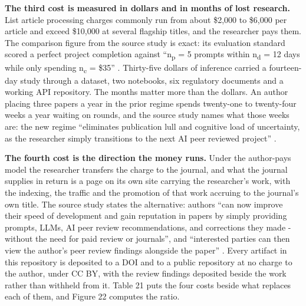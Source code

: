 \textbf{The third cost is measured in dollars and in months of lost research.}
List article processing charges commonly run from about \$2,000 to \$6,000 per
article and exceed \$10,000 at several flagship titles, and the researcher pays
them. The comparison figure from the source study is exact: its evaluation
standard scored a perfect project completion against ``n\textsubscript{p} = 5
prompts within n\textsubscript{d} = 12 days while only spending
n\textsubscript{c} = \$35'' \cite{aiprgliomatc}. Thirty-five dollars of
inference carried a fourteen-day study through a dataset, two notebooks, six
regulatory documents and a working API repository. The months matter more than
the dollars. An author placing three papers a year in the prior regime spends
twenty-one to twenty-four weeks a year waiting on rounds, and the source study
names what those weeks are: the new regime
``eliminates publication lull and cognitive load of uncertainty, as the
researcher simply transitions to the next AI peer reviewed project''
\cite{aiprgliomatc}.

\textbf{The fourth cost is the direction the money runs.} Under the author-pays
model the researcher transfers the charge to the journal, and what the journal
supplies in return is a page on its own site carrying the researcher's work,
with the indexing, the traffic and the promotion of that work accruing to the
journal's own title. The source study states the alternative: authors ``can now improve their speed of development and gain
reputation in papers by simply providing prompts, LLMs, AI peer review
recommendations, and corrections they made - without the need for paid review or
journals'', and ``interested parties can then view the author's peer review
findings alongside the paper'' \cite{aiprgliomatc}. Every artifact in this
repository is deposited to a DOI and to a public repository at no charge to the
author, under CC BY, with the review findings deposited beside the work rather
than withheld from it. Table 21 puts the four costs beside what replaces each of
them, and Figure 22 computes the ratio.

